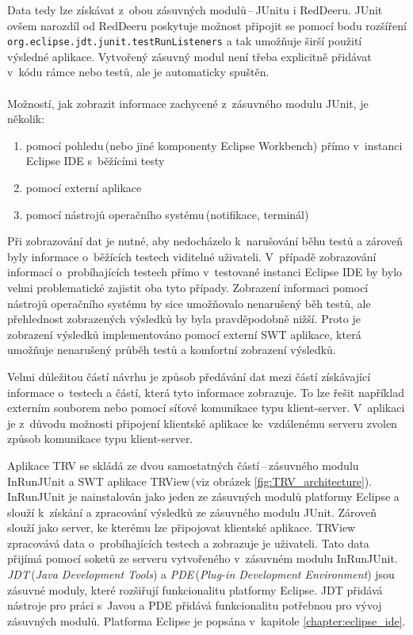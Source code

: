   Data tedy lze získávat z~obou zásuvných modulů\,--\,JUnitu i RedDeeru. JUnit ovšem narozdíl od RedDeeru poskytuje možnost připojit se pomocí bodu rozšíření\\\texttt{org.eclipse.jdt.junit.testRunListeners} a tak umožňuje širší použití výsledné aplikace. Vytvořený zásuvný modul není třeba explicitně přidávat v~kódu rámce nebo testů, ale je automaticky spuštěn.
  \\
  \\
  \noindent
  Možností, jak zobrazit informace zachycené z~zásuvného modulu JUnit, je několik:
  \begin{enumerate}
   \item pomocí pohledu\,(nebo jiné komponenty Eclipse Workbench) přímo v~instanci Eclipse IDE s~běžícími testy
   \item pomocí externí aplikace
   \item pomocí nástrojů operačního systému\,(notifikace, terminál)
  \end{enumerate}

  Při zobrazování dat je nutné, aby nedocházelo k~narušování běhu testů a zároveň byly informace o~běžících testech viditelné uživateli. V~případě zobrazování informací o~probíhajících testech přímo v~testované instanci Eclipse IDE by bylo velmi problematické zajistit oba tyto případy. Zobrazení informaci pomocí nástrojů operačního systému by sice umožňovalo nenarušený běh testů, ale přehlednost zobrazených výsledků by byla pravděpodobně nižší. Proto je zobrazení výsledků implementováno pomocí externí SWT aplikace, která umožňuje nenarušený průběh testů a komfortní zobrazení výsledků.

  Velmi důležitou částí návrhu je způsob předávání dat mezi částí získávající informace o~testech a částí, která tyto informace zobrazuje. To lze řešit například externím souborem nebo pomocí síťové komunikace typu klient-server. V~aplikaci je z~důvodu možnosti připojení klientské aplikace ke~vzdálenému serveru zvolen způsob komunikace typu klient-server.

  Aplikace TRV se skládá ze dvou samostatných částí\,--\,zásuvného modulu InRunJUnit a SWT aplikace TRView\,(viz obrázek \ref{fig:TRV_architecture}). InRunJUnit je nainstalován jako jeden ze zásuvných modulů platformy Eclipse a slouží k~získání a zpracování výsledků ze zásuvného modulu JUnit. Zároveň slouží jako server, ke kterému lze připojovat klientské aplikace. TRView zpracovává data o~probíhajících testech a zobrazuje je uživateli. Tato data přijímá pomocí soketů ze serveru vytvořeného v~zásuvném modulu InRunJUnit. \emph{JDT}\,(\emph{Java Development Tools}) a \emph{PDE}\,(\emph{Plug-in Development Environment}) jsou zásuvné moduly, které rozšiřují funkcionalitu platformy Eclipse. JDT přidává nástroje pro práci s~Javou a PDE přidává funkcionalitu potřebnou pro vývoj zásuvných modulů. Platforma Eclipse je popsána v~kapitole \ref{chapter:eclipse_ide}.

